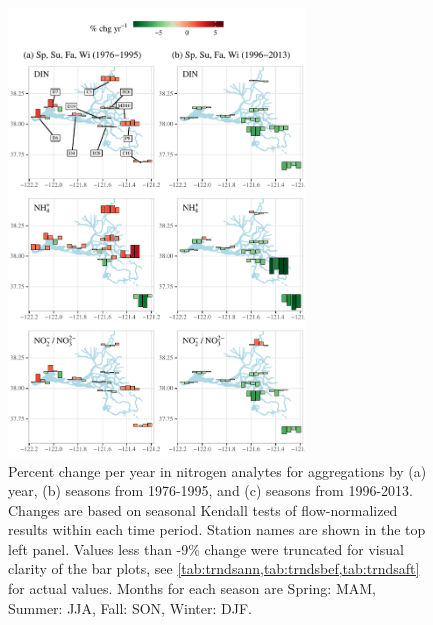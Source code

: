 \documentclass[journal = esthag, manuscript = article]{achemso}\usepackage[]{graphicx}\usepackage[]{color}
\begin{document}
\begin{figure}[!ht]

{\centering \includegraphics[width=0.7\textwidth]{figs/trndmap-1} 

}

\caption{Percent change per year in nitrogen analytes for aggregations by (a) year, (b) seasons from 1976-1995, and (c) seasons from 1996-2013.  Changes are based on seasonal Kendall tests of flow-normalized results within each time period. Station names are shown in the top left panel. Values less than -9\% change were truncated for visual clarity of the bar plots, see \cref{tab:trndsann,tab:trndsbef,tab:trndsaft} for actual values. Months for each season are Spring: MAM, Summer: JJA, Fall: SON, Winter: DJF.}\label{fig:trndmap}
\end{figure}
\end{document}
